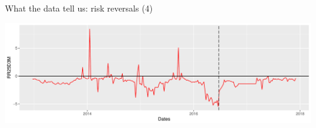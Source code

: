 \begin{frame}[fragile]{What the data tell us: risk reversals (4)}

\begin{Shaded}
\begin{Highlighting}[]
\StringTok{ }\OperatorTok{+}\StringTok{ }\NormalTok{(}\NormalTok{) }\OperatorTok{+}\StringTok{ }
\StringTok{        }\NormalTok{(}\NormalTok{)}
\StringTok{ }\OperatorTok{+}\StringTok{ }\NormalTok{(}\NormalTok{(}\NormalTok{((}\NormalTok{))),}
                     \NormalTok{)}
\end{Highlighting}
\end{Shaded}

\includegraphics[width=1\linewidth]{2018_02_07_IMF_FXCourse_files/figure-beamer/unnamed-chunk-14-1}

\end{frame}

